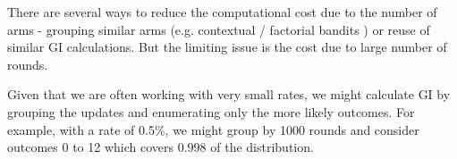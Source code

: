 \documentclass[11pt,a4,singlespacing,titlepagenumber=on]{scrreprt}
\numberwithin{equation}{chapter} %
\theoremstyle{remark}
\begin{document}
There are several ways to reduce the computational cost due to the number of arms - grouping similar arms (e.g. contextual / factorial bandits ) or reuse of similar GI calculations. But the limiting issue is the cost due to large number of rounds.

Given that we are often working with very small rates, we might calculate GI by grouping the updates and enumerating only the more likely outcomes. For example, with a rate of 0.5\%, we might group by 1000 rounds and consider outcomes 0 to 12 which covers 0.998 of the distribution. 
















\cleardoublepage
{}




{}


\appendix %
\end{document}
